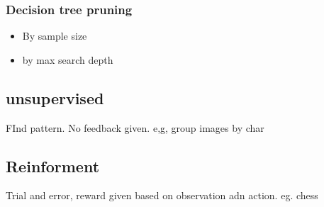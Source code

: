 \documentclass{article}
\begin{document}
\subsubsection*{Decision tree pruning}
\begin{itemize}
    \item By sample size 
    \item by max search depth
\end{itemize}
\subsection{unsupervised}
FInd pattern. No feedback given. e,g, group images by char 
\subsection{Reinforment}
Trial and error, reward given based on observation adn action. eg. chess 
\end{document}
